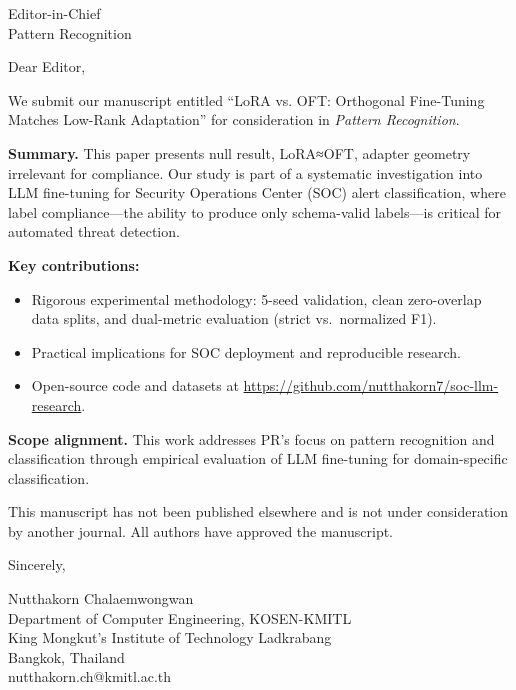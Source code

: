 \documentclass[11pt]{letter}
\begin{document}
\begin{letter}{Editor-in-Chief \\ Pattern Recognition}

\opening{Dear Editor,}

We submit our manuscript entitled ``LoRA vs. OFT: Orthogonal Fine-Tuning Matches Low-Rank Adaptation'' for consideration in \textit{Pattern Recognition}.

\textbf{Summary.} This paper presents null result, LoRA≈OFT, adapter geometry irrelevant for compliance. Our study is part of a systematic investigation into LLM fine-tuning for Security Operations Center (SOC) alert classification, where label compliance---the ability to produce only schema-valid labels---is critical for automated threat detection.

\textbf{Key contributions:}
\begin{itemize}
\item Rigorous experimental methodology: 5-seed validation, clean zero-overlap data splits, and dual-metric evaluation (strict vs.\ normalized F1).
\item Practical implications for SOC deployment and reproducible research.
\item Open-source code and datasets at \url{https://github.com/nutthakorn7/soc-llm-research}.
\end{itemize}

\textbf{Scope alignment.} This work addresses PR's focus on pattern recognition and classification through empirical evaluation of LLM fine-tuning for domain-specific classification.

This manuscript has not been published elsewhere and is not under consideration by another journal. All authors have approved the manuscript.

\closing{Sincerely,}

Nutthakorn Chalaemwongwan \\
Department of Computer Engineering, KOSEN-KMITL \\
King Mongkut's Institute of Technology Ladkrabang \\
Bangkok, Thailand \\
nutthakorn.ch@kmitl.ac.th

\end{letter}
\end{document}
